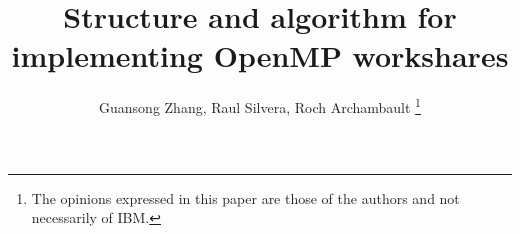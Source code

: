 
\date{}      %

\title{ Structure and algorithm for \\implementing OpenMP workshares}

\author{Guansong Zhang, Raul Silvera, Roch Archambault \thanks{The
    opinions expressed in this paper are those of the authors and not
    necessarily of IBM.}  }






\maketitle

\thispagestyle{empty}
